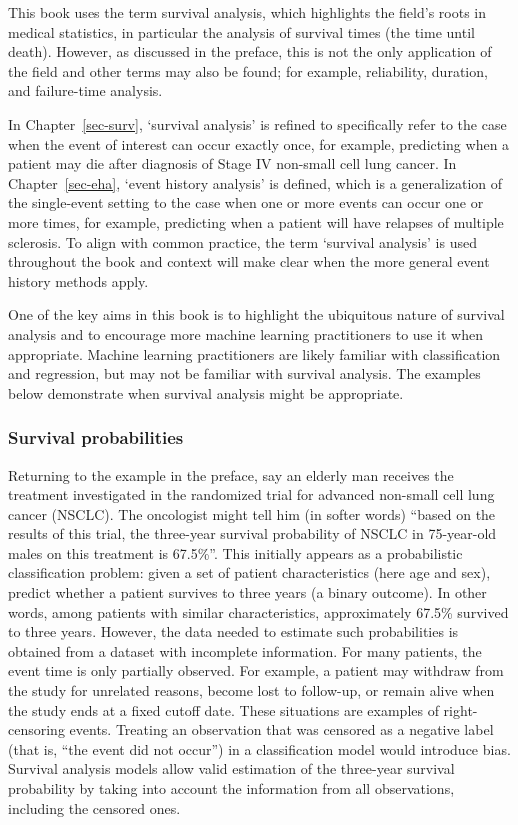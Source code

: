 \documentclass[
  letterpaper,
  krantz2]{style/krantz}
\begin{document}
This book uses the term survival analysis,
which highlights the field's roots in medical statistics, in particular
the analysis of survival times (the time until death). However, as
discussed in the preface, this is not the only application of the field
and other terms may also be found; for example, reliability, duration,
and failure-time analysis.

In Chapter~\ref{sec-surv}, `survival analysis' is refined to
specifically refer to the case when the event of interest can occur
exactly once, for example, predicting when a patient may die after
diagnosis of Stage IV non-small cell lung cancer. In
Chapter~\ref{sec-eha}, `event history
analysis' is defined, which is a
generalization of the single-event setting to the case when one or more
events can occur one or more times, for example, predicting when a
patient will have relapses of multiple sclerosis. To align with common
practice, the term `survival analysis' is used throughout the book and
context will make clear when the more general event history methods
apply.

One of the key aims in this book is to highlight the ubiquitous nature
of survival analysis and to encourage more machine learning
practitioners to use it when appropriate. Machine learning practitioners
are likely familiar with classification and regression, but may not be
familiar with survival analysis. The examples below demonstrate when
survival analysis might be appropriate.

\subsubsection*{Survival probabilities}\label{survival-probabilities}

Returning to the example in the preface, say an elderly man receives the
treatment investigated in the randomized trial for advanced non-small
cell lung cancer (NSCLC). The oncologist might tell him (in softer
words) ``based on the results of this trial, the three-year survival
probability of NSCLC in 75-year-old males on this treatment is 67.5\%''.
This initially appears as a probabilistic
classification problem: given a set
of patient characteristics (here age and sex), predict whether a patient
survives to three years (a binary outcome). In other words, among
patients with similar characteristics, approximately 67.5\% survived to
three years. However, the data needed to estimate such probabilities is
obtained from a dataset with incomplete information. For many patients,
the event time is only partially observed. For example, a patient may
withdraw from the study for unrelated reasons, become lost to follow-up,
or remain alive when the study ends at a fixed cutoff date. These
situations are examples of right-censoring
events. Treating an observation that was censored
as a negative label (that is, ``the event did not occur'') in a
classification model would introduce bias. Survival analysis models
allow valid estimation of the three-year survival probability by taking
into account the information from all observations, including the
censored ones.
\end{document}
